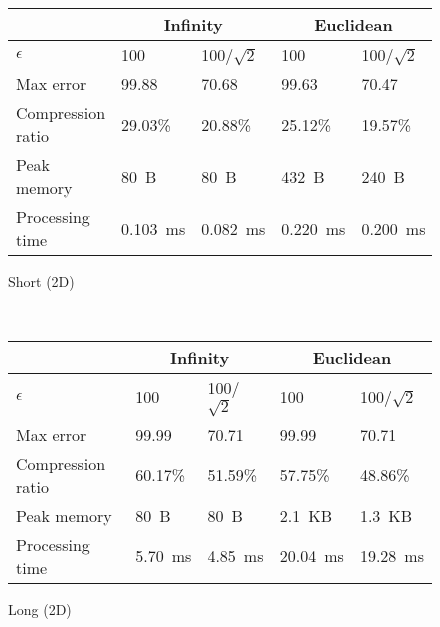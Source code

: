 \documentclass[10pt, conference, compsocconf]{IEEEtran}
\begin{document}
\begin{table}
    \begin{subfigure}{\columnwidth}
    \centering
    \begin{tabular}{l|l|l|l|l}
    \hline
    \rowcolor{headcolor}
                           & \multicolumn{2}{c|}{Infinity} & \multicolumn{2}{c}{Euclidean}\\ \hline
    $\epsilon$                & 100          & 100/$\sqrt{2}$  & 100         & 100/$\sqrt{2}$ \\
    Max error              & 99.88       & 70.68           & 99.63       & 70.47          \\ 
    Compression ratio      & 29.03\%      & 20.88\%         & 25.12\%     & 19.57\%        \\ 
    Peak memory            & 80~B          & 80~B             & 432~B        & 240~B           \\ 
    Processing time        & 0.103~ms      & 0.082~ms         & 0.220~ms     & 0.200~ms        \\ \hline
    \end{tabular}
    \caption{Short (2D)}
    \end{subfigure}\\
    \begin{subfigure}{\columnwidth}
    \centering
    \begin{tabular}{l|l|l|l|l}
    \hline
    \rowcolor{headcolor}
                   & \multicolumn{2}{c|}{Infinity} & \multicolumn{2}{c}{Euclidean} \\ \hline
    $\epsilon$             & 100        & 100/$\sqrt{2}$    & 100        & 100/$\sqrt{2}$    \\ 
    Max error              & 99.99     & 70.71             & 99.99      & 70.71             \\ 
    Compression ratio      & 60.17\%    & 51.59\%           & 57.75\%    & 48.86\%           \\ 
    Peak memory       & 80~B        & 80~B               & 2.1~KB      & 1.3~KB             \\ 
    Processing time      & 5.70~ms     & 4.85~ms            & 20.04~ms    & 19.28~ms           \\ \hline
    \end{tabular}
    \caption{Long (2D)}
    \end{subfigure}\\    
    \begin{subfigure}{\columnwidth}
    \centering
    \begin{tabular}{l|l|l|l|l}

\end{tabular}
\end{subfigure}
\end{table}
\end{document}
